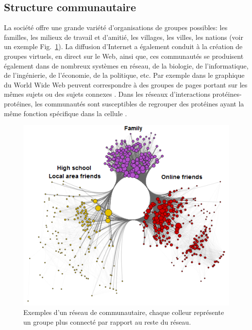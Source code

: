 \subsection{Structure communautaire}
La société offre une grande variété d'organisations de groupes possibles: les familles, les milieux de travail et d'amitié, les villages, les villes, les nations (voir un exemple Fig.~\ref{community-network}). La diffusion d'Internet a également conduit à la création de groupes virtuels, en direct sur le Web, ainsi que, ces communautés se produisent également dans de nombreux systèmes en réseau, de la biologie, de l'informatique, de l'ingénierie, de l'économie, de la politique, etc. Par exemple dans le graphique du World Wide Web peuvent correspondre à des groupes de pages portant sur les mêmes sujets ou des sujets connexes \cite{Dou-al2007,Flak-al2002}. Dans les réseaux d'interactions protéines-protéines, les communautés sont susceptibles de regrouper des protéines ayant la même fonction spécifique dans la cellule \cite{ChY2006,RivT2003}.\\

\begin{figure}[h!]
	\centering
	\includegraphics[scale=0.55]{./figures/community-network}
	\caption{Exemples d'un réseau de communautaire, chaque colleur représente un groupe plus connecté par rapport au reste du réseau.}
	\label{community-network}
\end{figure}

